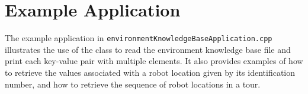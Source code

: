 \documentclass{CSSRforAfrica}
\begin{document}
\section{Example Application}
\label{section:application}
The example application in {\small \tt environmentKnowledgeBaseApplication.cpp} illustrates the use of the class to read the environment knowledge base file and print each key-value pair with multiple elements.  It also provides examples of how to retrieve the values associated with a robot location given by its identification number, and how to retrieve the sequence of robot locations in a tour. \\
\vspace{-5mm}
\end{document}
